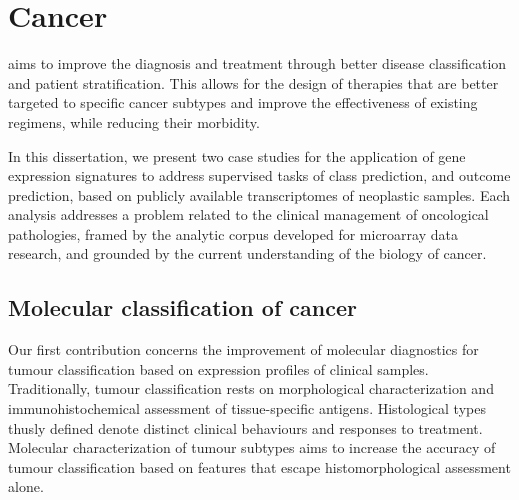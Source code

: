 \section{Cancer}
\label{cancer-discussion}


 aims to improve the diagnosis and treatment through
better disease classification and patient stratification.  This allows for the
design of therapies that are better targeted to specific cancer subtypes and
improve the effectiveness of existing regimens, while reducing their morbidity.

In this dissertation, we present two case studies for the application of gene
expression signatures to address supervised tasks of class prediction, and
outcome prediction, based on publicly available transcriptomes of neoplastic
samples.  Each analysis addresses a problem related to the clinical management
of oncological pathologies, framed by the analytic corpus developed for
microarray data research, and grounded by the current understanding of the
biology of cancer.


\subsection{Molecular classification of cancer}
\label{sec:molecular-classification}

Our first contribution concerns the improvement of molecular diagnostics for
tumour classification based on expression profiles of clinical samples.
Traditionally, tumour classification rests on morphological characterization and
immunohistochemical assessment of tissue-specific antigens.  Histological types
thusly defined denote distinct clinical behaviours and responses to treatment.
Molecular characterization of tumour subtypes aims to increase the accuracy of
tumour classification based on features that escape histomorphological
assessment alone.

